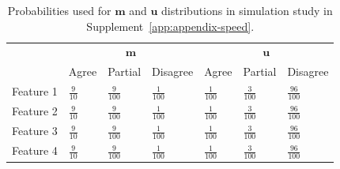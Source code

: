 \documentclass[ba,preprint]{imsart}
\begin{document}
		\begin{table}[h]
		\centering
		\begin{tabular}{llll|lll}
			\multicolumn{1}{c}{ } & \multicolumn{3}{c}{$\bm{m}$} & \multicolumn{3}{c}{$\bm{u}$} \\
			\cline{2-4} \cline{5-7}
			& Agree & Partial & Disagree & Agree & Partial & Disagree \\
			\hline
			Feature 1 & $\frac{9}{10}$ & $\frac{9}{100}$  & $\frac{1}{100}$ & $\frac{1}{100}$ &  $\frac{3}{100}$ & $\frac{96}{100}$ \\ 
			Feature 2 & $\frac{9}{10}$ & $\frac{9}{100}$  & $\frac{1}{100}$ & $\frac{1}{100}$ &  $\frac{3}{100}$ & $\frac{96}{100}$ \\ 
			Feature 3 & $\frac{9}{10}$ & $\frac{9}{100}$  & $\frac{1}{100}$ & $\frac{1}{100}$ &  $\frac{3}{100}$ & $\frac{96}{100}$ \\ 
			Feature 4 & $\frac{9}{10}$ & $\frac{9}{100}$  & $\frac{1}{100}$ & $\frac{1}{100}$ &  $\frac{3}{100}$ & $\frac{96}{100}$ \\ 
			\hline
		\end{tabular}
		\caption{Probabilities used for $\bm{m}$ and $\bm{u}$ distributions in simulation study in Supplement~\ref{app:appendix-speed}.}\label{Tab:distributions_2}
	\end{table}
	
\end{document}
